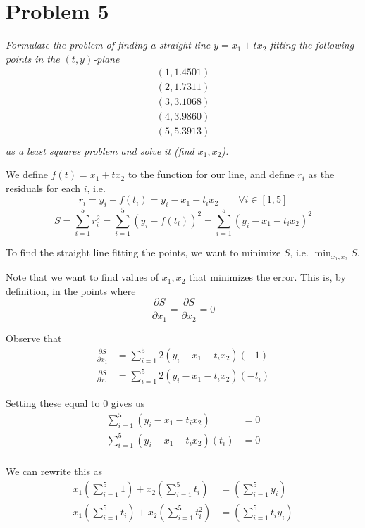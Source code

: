 \section{Problem 5}
\textit{Formulate the problem of finding a straight line $y = x_1 + tx_2$ fitting the following points in the $(t,y)$-plane}
\begin{align*}
    (1, 1.4501) \\
    (2, 1.7311) \\
    (3, 3.1068) \\
    (4, 3.9860) \\
    (5, 5.3913) \\
\end{align*}
\textit{as a least squares problem and solve it (find $x_1, x_2$).}

We define $f(t) = x_1 + tx_2$ to the function for our line, and define $r_i$ as the residuals for each $i$, i.e.
\begin{equation*}
    r_i = y_i - f(t_i) = y_i - x_1 - t_i x_2 \qquad \forall i \in [1, 5]
\end{equation*}
\begin{equation*}
    S = \sum_{i=1}^5 r_i^2 = \sum_{i=1}^5 (y_i - f(t_i))^2 = \sum_{i=1}^5 (y_i - x_1 - t_i x_2)^2
\end{equation*}

To find the straight line fitting the points, we want to minimize $S$, i.e. $\min_{x_1, x_2} S$.

Note that we want to find values of $x_1, x_2$ that minimizes the error. This is, by definition, in the points where 
\begin{equation*}
    \frac{\partial S}{\partial x_1} = \frac{\partial S}{ \partial x_2} = 0
\end{equation*}

Observe that 
\begin{align*}
    \frac{\partial S}{\partial x_1} &= \sum_{i=1}^5 2(y_i - x_1 - t_i x_2)(-1) \\
    \frac{\partial S}{\partial x_1} &= \sum_{i=1}^5 2(y_i - x_1 - t_i x_2)(-t_i)
\end{align*}

Setting these equal to $0$ gives us
\begin{align*}
    \sum_{i=1}^5 (y_i - x_1 - t_i x_2) &= 0 \\
    \sum_{i=1}^5 (y_i - x_1 - t_i x_2)(t_i) &= 0 \\
\end{align*}

We can rewrite this as
\begin{align*}
    x_1\left( \sum_{i=1}^5 1 \right) + x_2\left( \sum_{i=1}^5 t_i \right) &= \left( \sum_{i=1}^5 y_i \right)\\
    x_1\left( \sum_{i=1}^5 t_i \right) + x_2\left( \sum_{i=1}^5 t_i^2 \right) &= \left( \sum_{i=1}^5 t_i y_i \right)\\
\end{align*}

